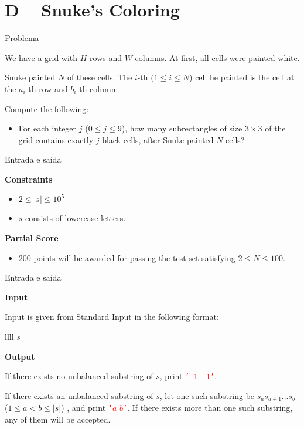 \section{D -- Snuke's Coloring}

\begin{frame}[fragile]{Problema}

We have a grid with $H$ rows and $W$ columns. At first, all cells were painted white.

Snuke painted $N$ of these cells. The $i$-th ($1\leq i\leq N$) cell he painted is the cell at the 
$a_i$-th row and $b_i$-th column.

Compute the following:

\begin{itemize}
    \item For each integer $j$ ($0\leq j\leq 9$), how many subrectangles of size $3\times 3$ of the
        grid contains exactly $j$ black cells, after Snuke painted $N$ cells?
\end{itemize}

\end{frame}

\begin{frame}[fragile]{Entrada e saída}

\textbf{Constraints}

\begin{itemize}
    \item $2\leq |s| \leq 10^5$
    \item $s$ consists of lowercase letters.
\end{itemize}

\vspace{0.1in}

\textbf{Partial Score}

\begin{itemize}
    \item 200 points will be awarded for passing the test set satisfying $2 \leq N\leq 100$.
\end{itemize}

\end{frame}

\begin{frame}[fragile]{Entrada e saída}

\textbf{Input}

Input is given from Standard Input in the following format:
\begin{atcoderio}{llll}
$s$ \\
\end{atcoderio}

\textbf{Output}

If there exists no unbalanced substring of $s$, print \texttt{\textcolor{red}{'-1 -1'}}.

If there exists an unbalanced substring of $s$, let one such substring be $s_as_{a+1}\ldots s_b$
($1\leq a < b \leq |s|$) , and print {\textcolor{red}{\texttt{'}$a$ $b$\texttt{'}}}. If there exists more than one
such substring, any of them will be accepted.

\end{frame}

